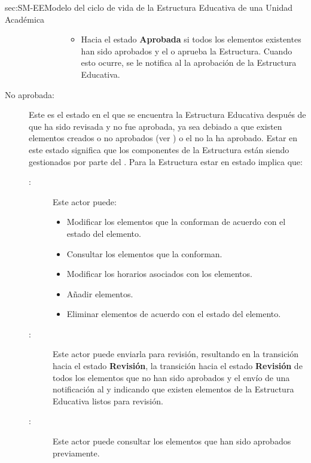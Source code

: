 \begin{Maquina}{sec:SM-EE}{Modelo del ciclo de vida de la Estructura Educativa de una Unidad Académica}
\begin{description}
\begin{description}
\begin{itemize}
\begin{itemize}
			\item Hacia el estado {\bf Aprobada} si todos los elementos existentes han sido aprobados y el  o  aprueba la Estructura. Cuando esto ocurre, se le notifica al  la aprobación de la Estructura Educativa.
		\end{itemize}
	\end{itemize}
\end{description}



\item[No aprobada:] Este es el estado en el que se encuentra la Estructura Educativa después de que ha sido revisada y no fue aprobada, ya sea debiado a que existen elementos creados o no aprobados (ver  ) o el  no la ha aprobado. Estar en este estado significa que los componentes de la Estructura están siendo gestionados por parte del . Para la Estructura estar en estado implica que:

\begin{description}
	\item[:] Este actor puede:
		\begin{itemize} 
			\item Modificar los elementos que la conforman de acuerdo con el estado del elemento.
			\item Consultar los elementos que la conforman.
			\item Modificar los horarios asociados con los elementos.
			\item Añadir elementos.
			\item Eliminar elementos de acuerdo con el estado del elemento.
		\end{itemize}

	\item[:] Este actor puede enviarla para revisión, resultando en la transición hacia el estado {\bf Revisión}, la transición hacia el estado {\bf Revisión} de todos los elementos que no han sido aprobados y el envío de una notificación al  y  indicando que existen elementos de la Estructura Educativa listos para revisión. 
		
	
	\item[:] Este actor puede consultar los elementos que han sido aprobados previamente.
			

\end{description}
\end{description}
\end{Maquina}
